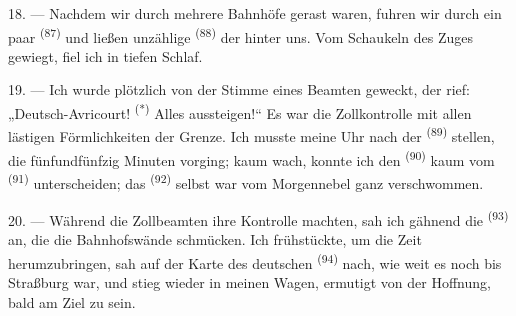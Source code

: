 18. --- Nachdem wir durch mehrere Bahnhöfe gerast waren, fuhren wir durch ein paar
 \textsuperscript{(87)} und ließen unzählige 
\textsuperscript{(88)} der  hinter uns. Vom Schaukeln des Zuges
gewiegt, fiel ich in tiefen Schlaf.

\VUsaut{3.0mm}
\VUsaut{3.0mm}

19. --- Ich wurde plötzlich von der Stimme eines Beamten geweckt, der rief:
„Deutsch-Avricourt! \textsuperscript{(*)} Alles aussteigen!“ Es war die
Zollkontrolle mit allen lästigen Förmlichkeiten der Grenze. Ich musste meine Uhr
nach der  \textsuperscript{(89)} stellen, die
fünfundfünfzig Minuten vorging; kaum wach, konnte ich den 
\textsuperscript{(90)} kaum vom  \textsuperscript{(91)}
unterscheiden; das  \textsuperscript{(92)} selbst war vom
Morgennebel ganz verschwommen.

20. --- Während die Zollbeamten ihre Kontrolle machten, sah ich gähnend die
 \textsuperscript{(93)} an, die die Bahnhofswände schmücken. Ich
frühstückte, um die Zeit herumzubringen, sah auf der Karte des deutschen
 \textsuperscript{(94)} nach, wie weit es noch bis Straßburg
war, und stieg wieder in meinen Wagen, ermutigt von der Hoffnung, bald am Ziel zu
sein.
\VUsaut{6.0mm}
\VUfilet{22mm}
